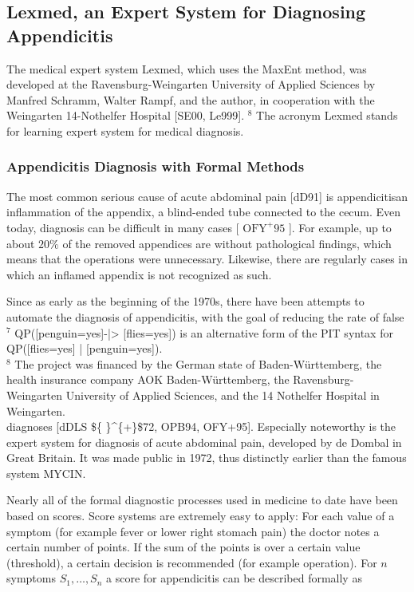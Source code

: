 \documentclass[10pt]{article}
\begin{document}
\subsection*{Lexmed, an Expert System for Diagnosing Appendicitis}
The medical expert system Lexmed, which uses the MaxEnt method, was developed at the Ravensburg-Weingarten University of Applied Sciences by Manfred Schramm, Walter Rampf, and the author, in cooperation with the Weingarten 14-Nothelfer Hospital [SE00, Le999]. ${ }^{8}$ The acronym Lexmed stands for learning expert system for medical diagnosis.

\subsubsection*{Appendicitis Diagnosis with Formal Methods}
The most common serious cause of acute abdominal pain [dD91] is appendicitisan inflammation of the appendix, a blind-ended tube connected to the cecum. Even today, diagnosis can be difficult in many cases [ $\mathrm{OFY}^{+} 95$ ]. For example, up to about $20 \%$ of the removed appendices are without pathological findings, which means that the operations were unnecessary. Likewise, there are regularly cases in which an inflamed appendix is not recognized as such.

Since as early as the beginning of the 1970s, there have been attempts to automate the diagnosis of appendicitis, with the goal of reducing the rate of false\\
${ }^{7}$ QP([penguin=yes]-|> [flies=yes]) is an alternative form of the PIT syntax for QP([flies=yes] | [penguin=yes]).\\
${ }^{8}$ The project was financed by the German state of Baden-Württemberg, the health insurance company AOK Baden-Württemberg, the Ravensburg-Weingarten University of Applied Sciences, and the 14 Nothelfer Hospital in Weingarten.\\[0pt]
diagnoses [dDLS \$\{ \}\^{}\{+\}\$72, OPB94, OFY+95]. Especially noteworthy is the expert system for diagnosis of acute abdominal pain, developed by de Dombal in Great Britain. It was made public in 1972, thus distinctly earlier than the famous system MYCIN.

Nearly all of the formal diagnostic processes used in medicine to date have been based on scores. Score systems are extremely easy to apply: For each value of a symptom (for example fever or lower right stomach pain) the doctor notes a certain number of points. If the sum of the points is over a certain value (threshold), a certain decision is recommended (for example operation). For $n$ symptoms $S_{1}, \ldots, S_{n}$ a score for appendicitis can be described formally as
\end{document}

